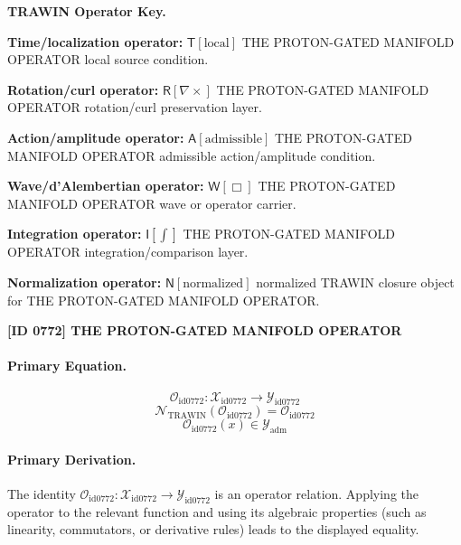 \par\vspace{0.45\baselineskip}
\noindent\begin{minipage}[t]{\linewidth}
\begingroup
\small
\raggedright
\textbf{TRAWIN Operator Key.}\par
\noindent\textbf{Time/localization operator:} $\mathsf{T}\!\left[\mathrm{local}\right]$ THE PROTON-GATED MANIFOLD OPERATOR local source condition.\par
\noindent\textbf{Rotation/curl operator:} $\mathsf{R}\!\left[\nabla\times\right]$ THE PROTON-GATED MANIFOLD OPERATOR rotation/curl preservation layer.\par
\noindent\textbf{Action/amplitude operator:} $\mathsf{A}\!\left[\mathrm{admissible}\right]$ THE PROTON-GATED MANIFOLD OPERATOR admissible action/amplitude condition.\par
\noindent\textbf{Wave/d'Alembertian operator:} $\mathsf{W}\!\left[\Box\right]$ THE PROTON-GATED MANIFOLD OPERATOR wave or operator carrier.\par
\noindent\textbf{Integration operator:} $\mathsf{I}\!\left[\int\right]$ THE PROTON-GATED MANIFOLD OPERATOR integration/comparison layer.\par
\noindent\textbf{Normalization operator:} $\mathsf{N}\!\left[\mathrm{normalized}\right]$ normalized TRAWIN closure object for THE PROTON-GATED MANIFOLD OPERATOR.\par
\endgroup
\end{minipage}

\clearpage
\noindent\textbf{[ID 0772] THE PROTON-GATED MANIFOLD OPERATOR}\par
\vspace{0.35em}
\paragraph{Primary Equation.}
\[
\mathcal{O}_{\mathrm{id0772}}:\mathcal{X}_{\mathrm{id0772}}\longrightarrow\mathcal{Y}_{\mathrm{id0772}}
\]
\[
\mathcal{N}_{\mathrm{TRAWIN}}(\mathcal{O}_{\mathrm{id0772}})=\mathcal{O}_{\mathrm{id0772}}
\]
\[
\mathcal{O}_{\mathrm{id0772}}(x)\in\mathcal{Y}_{\mathrm{adm}}
\]

\paragraph{Primary Derivation.}
The identity \( \mathcal{O}_{\mathrm{id0772}}:\mathcal{X}_{\mathrm{id0772}}\longrightarrow\mathcal{Y}_{\mathrm{id0772}} \) is an operator relation. Applying the operator to the relevant function and using its algebraic properties (such as linearity, commutators, or derivative rules) leads to the displayed equality.
